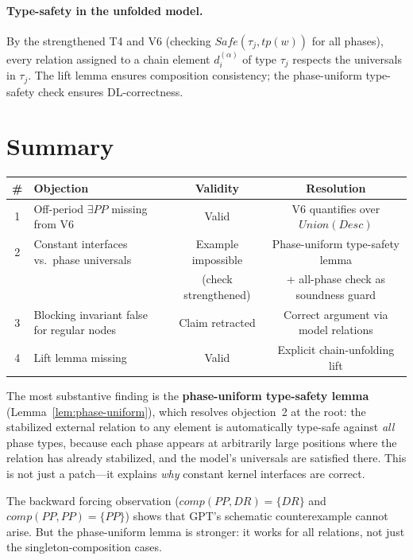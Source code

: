 \documentclass[11pt]{article}
\newcommand{\DR}{\mathit{DR}}
\newcommand{\PP}{\mathit{PP}}
\newcommand{\comp}{\mathit{comp}}
\newcommand{\tp}{\mathit{tp}}
\newcommand{\Desc}{\mathit{Desc}}
\newcommand{\Union}{\mathit{Union}}
\newcommand{\Safe}{\mathit{Safe}}
\theoremstyle{definition}
\begin{document}
\paragraph{Type-safety in the unfolded model.}
By the strengthened T4 and V6 (checking $\Safe(\tau_j, \tp(w))$
for all phases), every relation assigned to a chain element
$d_i^{(\alpha)}$ of type $\tau_j$ respects the universals in
$\tau_j$.  The lift lemma ensures composition consistency; the
phase-uniform type-safety check ensures DL-correctness.

\section{Summary}

\begin{center}
\begin{tabular}{clcc}
\hline
\textbf{\#} & \textbf{Objection} & \textbf{Validity} &
\textbf{Resolution} \\
\hline
1 & Off-period $\exists\PP$ missing from V6 & Valid &
  V6 quantifies over $\Union(\Desc)$ \\
2 & Constant interfaces vs.\ phase universals &
  Example impossible &
  Phase-uniform type-safety lemma \\
  & & (check strengthened) &
  + all-phase check as soundness guard \\
3 & Blocking invariant false for regular nodes &
  Claim retracted &
  Correct argument via model relations \\
4 & Lift lemma missing & Valid &
  Explicit chain-unfolding lift \\
\hline
\end{tabular}
\end{center}

\medskip
The most substantive finding is the \textbf{phase-uniform
type-safety lemma} (Lemma~\ref{lem:phase-uniform}), which
resolves objection~2 at the root: the stabilized external
relation to any element is automatically type-safe against
\emph{all} phase types, because each phase appears at
arbitrarily large positions where the relation has already
stabilized, and the model's universals are satisfied there.
This is not just a patch---it explains \emph{why} constant
kernel interfaces are correct.

The backward forcing observation
($\comp(\PP, \DR) = \{\DR\}$ and $\comp(\PP, \PP) = \{\PP\}$)
shows that GPT's schematic counterexample cannot arise.  But
the phase-uniform lemma is stronger: it works for all
relations, not just the singleton-composition cases.
\end{document}
